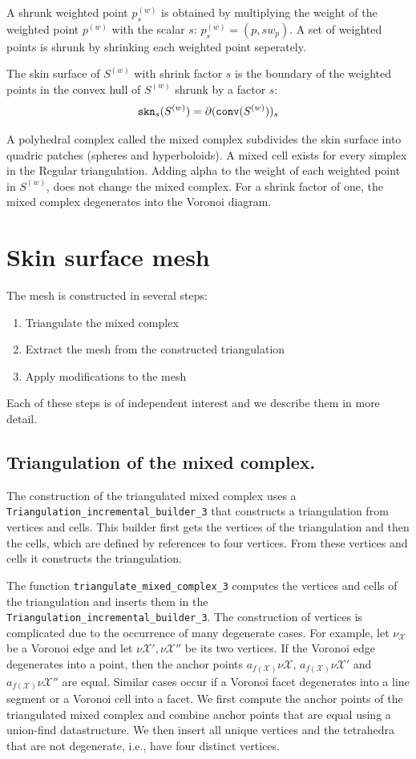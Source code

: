A shrunk weighted point ${p}^{(w)}_{s}$ is obtained by multiplying the
weight of the weighted point ${p}^{(w)}$ with the scalar $s$:
${p}^{(w)}_{s}= (p,s w_p)$. A set of weighted points is shrunk by
shrinking each weighted point seperately.

The skin surface of ${S}^{(w)}$ with shrink factor $s$ is the boundary
of the weighted points in the convex hull of ${S}^{(w)}$ shrunk by a
factor $s$:
\[{\tt skn}_s({S}^{(w)}) =
\partial({\tt conv}({S}^{(w)}))_s\]

A polyhedral complex called the mixed complex subdivides the skin
surface into quadric patches (spheres and hyperboloids). A mixed cell
exists for every simplex in the Regular triangulation. Adding alpha to
the weight of each weighted point in $S^{(w)}$, does not change the
mixed complex. For a shrink factor of one, the mixed complex
degenerates into the Voronoi diagram.

\section{Skin surface mesh}
The mesh is constructed in several steps:
\begin{enumerate}
\item Triangulate the mixed complex
\item Extract the mesh from the constructed triangulation
\item Apply modifications to the mesh
\end{enumerate}
Each of these steps is of independent interest and we describe them in
more detail.

\subsection{Triangulation of the mixed complex.}
The construction of the triangulated mixed complex uses a
\verb~Triangulation_incremental_builder_3~ that constructs a
triangulation from vertices and cells. This builder first gets the
vertices of the triangulation and then the cells, which are defined by
references to four vertices. From these vertices and cells it
constructs the triangulation.

The function \verb~triangulate_mixed_complex_3~ computes the vertices
and cells of the triangulation and inserts them in the
\verb~Triangulation_incremental_builder_3~. The construction of
vertices is complicated due to the occurrence of many degenerate
cases.  For example, let $\nu_{\mathcal{X}}$ be a Voronoi edge and
let $\nu{\mathcal{X}'}, \nu{\mathcal{X}''}$ be its two vertices.
If the Voronoi edge degenerates into a point, then the anchor points
$a_{f({\mathcal{X}})}{\nu{\mathcal{X}}}$,
$a_{f({\mathcal{X}})}{\nu{\mathcal{X}'}}$ and
$a_{f({\mathcal{X}})}{\nu{\mathcal{X}''}}$ are equal. Similar
cases occur if a Voronoi facet degenerates into a line segment or a
Voronoi cell into a facet. We first compute the anchor points of the
triangulated mixed complex and combine anchor points that are equal
using a union-find datastructure. We then insert all unique vertices
and the tetrahedra that are not degenerate, i.e., have four distinct
vertices.

